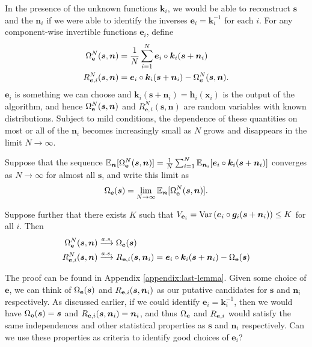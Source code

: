 In the presence of the unknown functions $\bm{k}_i$, we would be able to reconstruct $\bm{s}$ and the $\bm{n}_i$ if we were able to identify the inverses $\bm{e}_i = \bm{k}_i^{-1}$ for each $i$.
For any component-wise invertible functions $\bm{e}_i$, define
\begin{align*}
\Omega_{\mathbf{e}}^N(\bm{s}, \bm{n}) &= \frac{1}{N} \sum_{i=1}^N \bm{e}_i\circ \bm{k}_i( \bm{s} + \bm{n}_i) \\
R_{\bm{e}, i}^N(\bm{s}, \bm{n}) &= \bm{e}_i\circ \bm{k}_i( \bm{s} + \bm{n}_i) - \Omega_{\bm{e}}^N(\bm{s}, \bm{n}).\\
\end{align*}
$\bm{e}_i$ is something we can choose and $\bm{k}_i(\bm{s}+\bm{n}_i) = \bm{h}_i(\bm{x}_i)$ is the output of the algorithm, and hence $\Omega_{\mathbf{e}}^N(\bm{s}, \bm{n})$ and $R_{\bm{e}, i}^N(\bm{s}, \bm{n})$ are random variables with known distributions.
Subject to mild conditions, the dependence of these quantities on most or all of the $\bm{n}_i$ becomes increasingly small as $N$ grows and disappears in the limit $N\to\infty$.

\medskip

\begin{lemma}\label{lem:last-lemma}
	Suppose that the sequence $\mathbb{E}_{\bm{n}}[\Omega_{\mathbf{e}}^N(\bm{s}, \bm{n})] = \frac{1}{N}\sum_{i=1}^N \mathbb{E}_{\bm{n}_i}[\bm{e}_i\circ \bm{k}_i( \bm{s} + \bm{n}_i)] $ converges as $N \to \infty$ for almost all $\bm{s}$, and write this limit as
	\begin{align*}
	\Omega_{\mathbf{e}}(\bm{s}) = \lim_{N\to\infty}\mathbb{E}_{\bm{n}}[\Omega_{\mathbf{e}}^N(\bm{s}, \bm{n})].
	\end{align*}
	
	Suppose further that there exists $K$ such that $V_{\mathbf{e}_i} = \mathrm{Var}\left(\bm{e}_i \circ \bm{g}_i(\bm{s} + \bm{n}_i) \right) \leq K$ for all $i$.
	Then
	\begin{align*}
	\Omega_{\mathbf{e}}^N(\bm{s}, \bm{n}) & \overset{a.s.}{\longrightarrow} \Omega_{\mathbf{e}}(\bm{s}) \\
	R_{\mathbf{e}, i}^N(\bm{s}, \bm{n}) & \overset{a.s.}{\longrightarrow} R_{\mathbf{e}, i}(\bm{s}, \bm{n}_i) = \bm{e}_i\circ \bm{k}_i( \bm{s} + \bm{n}_i) - \Omega_{\mathbf{e}}(\bm{s})
	\end{align*}
\end{lemma}

The proof can be found in Appendix \ref{appendix:last-lemma}.
Given some choice of $\bm{e}$, we can think of $\Omega_{\mathbf{e}}(\bm{s})$ and $R_{\mathbf{e}, i}(\bm{s}, \bm{n}_i)$ as our putative candidates for $\bm{s}$ and $\bm{n}_i$ respectively.
As discussed earlier, if we could identify $\bm{e}_i=\bm{k}_i^{-1}$, then we would have $\Omega_{\mathbf{e}}(\bm{s}) = \bm{s}$ and $R_{\mathbf{e}, i}(\bm{s}, \bm{n}_i) = \bm{n}_i$, and thus $\Omega_{\mathbf{e}}$ and $R_{\mathbf{e}, i}$ would satisfy the same independences and other statistical properties as $\bm{s}$ and $\bm{n}_i$ respectively.
Can we use these properties as criteria to identify good choices of $\bm{e}_i$?

